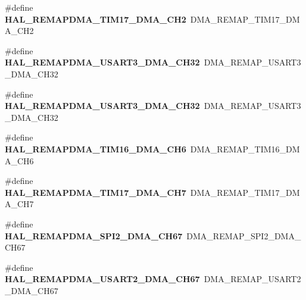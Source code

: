 \begin{DoxyCompactItemize}
\#define {\bfseries H\+A\+L\+\_\+\+R\+E\+M\+A\+P\+D\+M\+A\+\_\+\+T\+I\+M17\+\_\+\+D\+M\+A\+\_\+\+C\+H2}~D\+M\+A\+\_\+\+R\+E\+M\+A\+P\+\_\+\+T\+I\+M17\+\_\+\+D\+M\+A\+\_\+\+C\+H2
\item 
\mbox{\label{group___h_a_l___d_m_a___aliased___defines_ga79d86fdf916efa7463e359ac4a404e29}} 
\#define {\bfseries H\+A\+L\+\_\+\+R\+E\+M\+A\+P\+D\+M\+A\+\_\+\+U\+S\+A\+R\+T3\+\_\+\+D\+M\+A\+\_\+\+C\+H32}~D\+M\+A\+\_\+\+R\+E\+M\+A\+P\+\_\+\+U\+S\+A\+R\+T3\+\_\+\+D\+M\+A\+\_\+\+C\+H32
\item 
\mbox{\label{group___h_a_l___d_m_a___aliased___defines_ga79d86fdf916efa7463e359ac4a404e29}} 
\#define {\bfseries H\+A\+L\+\_\+\+R\+E\+M\+A\+P\+D\+M\+A\+\_\+\+U\+S\+A\+R\+T3\+\_\+\+D\+M\+A\+\_\+\+C\+H32}~D\+M\+A\+\_\+\+R\+E\+M\+A\+P\+\_\+\+U\+S\+A\+R\+T3\+\_\+\+D\+M\+A\+\_\+\+C\+H32
\item 
\mbox{\label{group___h_a_l___d_m_a___aliased___defines_ga982538686481944a0bb7277321303bee}} 
\#define {\bfseries H\+A\+L\+\_\+\+R\+E\+M\+A\+P\+D\+M\+A\+\_\+\+T\+I\+M16\+\_\+\+D\+M\+A\+\_\+\+C\+H6}~D\+M\+A\+\_\+\+R\+E\+M\+A\+P\+\_\+\+T\+I\+M16\+\_\+\+D\+M\+A\+\_\+\+C\+H6
\item 
\mbox{\label{group___h_a_l___d_m_a___aliased___defines_ga5ff091f7f81537b41fe4bac1d0f7918b}} 
\#define {\bfseries H\+A\+L\+\_\+\+R\+E\+M\+A\+P\+D\+M\+A\+\_\+\+T\+I\+M17\+\_\+\+D\+M\+A\+\_\+\+C\+H7}~D\+M\+A\+\_\+\+R\+E\+M\+A\+P\+\_\+\+T\+I\+M17\+\_\+\+D\+M\+A\+\_\+\+C\+H7
\item 
\mbox{\label{group___h_a_l___d_m_a___aliased___defines_ga6376d9fb648c5df3bbd41746b98cb986}} 
\#define {\bfseries H\+A\+L\+\_\+\+R\+E\+M\+A\+P\+D\+M\+A\+\_\+\+S\+P\+I2\+\_\+\+D\+M\+A\+\_\+\+C\+H67}~D\+M\+A\+\_\+\+R\+E\+M\+A\+P\+\_\+\+S\+P\+I2\+\_\+\+D\+M\+A\+\_\+\+C\+H67
\item 
\mbox{\label{group___h_a_l___d_m_a___aliased___defines_gad932cab9ecf9c8d136b8421d8506a270}} 
\#define {\bfseries H\+A\+L\+\_\+\+R\+E\+M\+A\+P\+D\+M\+A\+\_\+\+U\+S\+A\+R\+T2\+\_\+\+D\+M\+A\+\_\+\+C\+H67}~D\+M\+A\+\_\+\+R\+E\+M\+A\+P\+\_\+\+U\+S\+A\+R\+T2\+\_\+\+D\+M\+A\+\_\+\+C\+H67

\end{DoxyCompactItemize}
